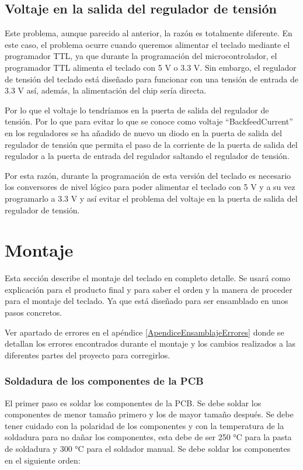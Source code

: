 \subsection{Voltaje en la salida del regulador de tensión} \label{VoltajeRegulador}
Este problema, aunque parecido al anterior, la razón es totalmente diferente. En este caso, el problema ocurre cuando queremos alimentar el teclado mediante el programador \gls{TTL}, ya que durante la programación del microcontrolador, el programador \gls{TTL} alimenta el teclado con 5 V o 3.3 V. Sin embargo, el regulador de tensión del teclado está diseñado para funcionar con una tensión de entrada de 3.3 V así, además, la alimentación del chip sería directa.

Por lo que el voltaje lo tendríamos en la puerta de salida del regulador de tensión. Por lo que para evitar lo que se conoce como voltaje ``\gls{BackfeedCurrent}'' en los reguladores se ha añadido de nuevo un diodo en la puerta de salida del regulador de tensión que permita el paso de la corriente de la puerta de salida del regulador a la puerta de entrada del regulador saltando el regulador de tensión.

Por esta razón, durante la programación de esta versión del teclado es necesario los conversores de nivel lógico para poder alimentar el teclado con 5 V y a su vez programarlo a 3.3 V y así evitar el problema del voltaje en la puerta de salida del regulador de tensión.

\newpage
\section{Montaje} \label{MontajeTeclado}
Esta sección describe el montaje del teclado en completo detalle. Se usará como explicación para el producto final y para saber el orden y la manera de proceder para el montaje del teclado. Ya que está diseñado para ser ensamblado en unos pasos concretos.

\begin{tcolorbox}[colback=red!11!white, colframe=red!50!white, title=Errores]
    Ver apartado de errores en el apéndice \ref{ApendiceEnsamblajeErrores} donde se detallan los errores encontrados durante el montaje y los cambios realizados a las diferentes partes del proyecto para corregirlos.
\end{tcolorbox}

\subsubsection{Soldadura de los componentes de la \gls{PCB}}
El primer paso es soldar los componentes de la \gls{PCB}. Se debe soldar los componentes de menor tamaño primero y los de mayor tamaño después. Se debe tener cuidado con la polaridad de los componentes y con la temperatura de la soldadura para no dañar los componentes, esta debe de ser 250 °C para la pasta de soldadura y 300 °C para el soldador manual. Se debe soldar los componentes en el siguiente orden:

